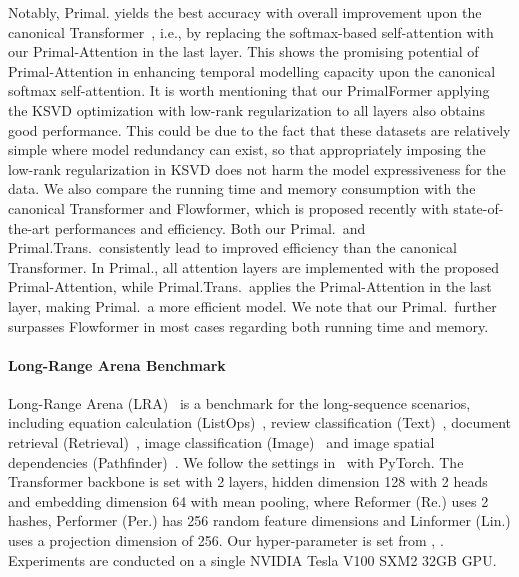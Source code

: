 \documentclass{article}
\begin{document}
Notably, Primal. yields the best accuracy with  overall improvement upon the canonical Transformer~\cite{vaswani2017attention}, i.e., by replacing the softmax-based self-attention with our Primal-Attention in the last layer.
This shows the promising potential of Primal-Attention in enhancing temporal modelling capacity upon the canonical softmax self-attention. 
It is worth mentioning that our PrimalFormer applying the KSVD optimization with low-rank regularization to all layers also obtains good performance. 
This could be due to the fact that these datasets are relatively simple where model redundancy can exist, so that appropriately imposing the low-rank regularization in KSVD does not harm the model expressiveness for the data. 
{We also compare the running time and memory consumption with the canonical Transformer and Flowformer, which is proposed recently with state-of-the-art performances and efficiency. 
	Both our Primal.~and Primal.Trans.~consistently lead to improved efficiency than the canonical Transformer. 
	In Primal., all attention layers are implemented with the proposed Primal-Attention, while Primal.Trans.~applies the Primal-Attention in the last layer, making Primal.~a more efficient model. 
	We note that our Primal.~further surpasses Flowformer in most cases regarding both running time and memory.}

\paragraph{Long-Range Arena Benchmark} 
\label{subsec::lra}
Long-Range Arena (LRA)~\cite{tay2020long} is a benchmark for the long-sequence scenarios, including equation calculation (ListOps)~\cite{nangia2018listops}, review classification (Text)~\cite{maas2011learning}, document retrieval (Retrieval)~\cite{radev2013acl}, image classification (Image)~\cite{krizhevsky2009learning} and image spatial dependencies (Pathfinder)~\cite{linsley2018learning}.
We follow the settings in~\cite{xiong2021nystromformer} with PyTorch.
The Transformer backbone is set with 2 layers, hidden dimension 128 with 2 heads and embedding dimension 64 with mean pooling, where Reformer (Re.) uses 2 hashes, Performer (Per.) has 256 random feature dimensions and Linformer (Lin.) uses a projection dimension of 256.
{Our hyper-parameter is set from , .}
Experiments are conducted on a single NVIDIA Tesla V100 SXM2 32GB GPU.
\end{document}

